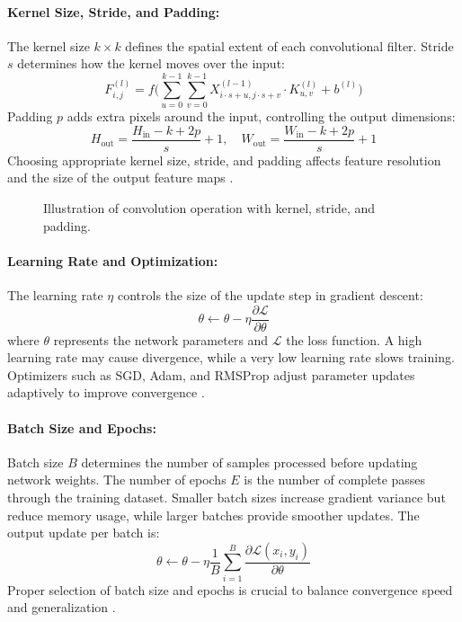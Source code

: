 \paragraph{Kernel Size, Stride, and Padding:}  
The kernel size \(k \times k\) defines the spatial extent of each convolutional filter. Stride \(s\) determines how the kernel moves over the input:
\[
F^{(l)}_{i,j} = f\Big(\sum_{u=0}^{k-1} \sum_{v=0}^{k-1} X^{(l-1)}_{i\cdot s + u, j \cdot s + v} \cdot K^{(l)}_{u,v} + b^{(l)}\Big)
\]
Padding \(p\) adds extra pixels around the input, controlling the output dimensions:
\[
H_{\text{out}} = \frac{H_{\text{in}} - k + 2p}{s} + 1, \quad W_{\text{out}} = \frac{W_{\text{in}} - k + 2p}{s} + 1
\]
Choosing appropriate kernel size, stride, and padding affects feature resolution and the size of the output feature maps \cite{goodfellow2016deep}.

\begin{figure}[H]
	\centering
	
	\caption{Illustration of convolution operation with kernel, stride, and padding.}
\end{figure}

\paragraph{Learning Rate and Optimization:}  
The learning rate \(\eta\) controls the size of the update step in gradient descent:
\[
\theta \leftarrow \theta - \eta \frac{\partial \mathcal{L}}{\partial \theta}
\]
where \(\theta\) represents the network parameters and \(\mathcal{L}\) the loss function. A high learning rate may cause divergence, while a very low learning rate slows training. Optimizers such as SGD, Adam, and RMSProp adjust parameter updates adaptively to improve convergence \cite{kingma2014adam, pytorchdocs}.

\paragraph{Batch Size and Epochs:}  
Batch size \(B\) determines the number of samples processed before updating network weights. The number of epochs \(E\) is the number of complete passes through the training dataset. Smaller batch sizes increase gradient variance but reduce memory usage, while larger batches provide smoother updates. The output update per batch is:
\[
\theta \leftarrow \theta - \eta \frac{1}{B} \sum_{i=1}^{B} \frac{\partial \mathcal{L}(x_i, y_i)}{\partial \theta}
\]
Proper selection of batch size and epochs is crucial to balance convergence speed and generalization \cite{pinto2022springer}.

